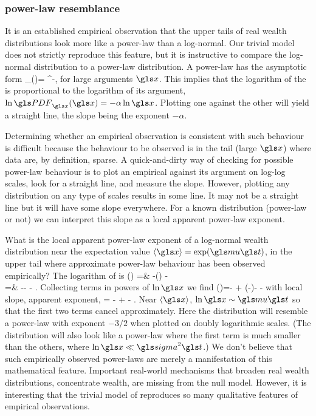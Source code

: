 \subsubsection{power-law resemblance}
It is an established empirical observation \cite{Newman2005} that the upper tails of 
real wealth distributions look more like a power-law than a log-normal. Our trivial model does not
strictly reproduce this feature, but it is instructive to compare the log-normal distribution
to a power-law distribution. A power-law \PDFa has the asymptotic form 
\be
\PDF_\x(\x)= \x^{-\alpha},
\ee
for large arguments $\x$. This implies that the logarithm of the \PDFa is proportional 
to the logarithm of its argument, $\ln \PDF_\x(\x) = -\alpha \ln \x$. Plotting
one against the other will yield a straight line, the slope being the exponent $-\alpha$. 

Determining whether an empirical observation is consistent with such behaviour 
is difficult because the behaviour to be observed is in the tail (large $\x$) where data are,
by definition, sparse. A quick-and-dirty way of checking for possible power-law 
behaviour is to plot an empirical \PDFa against its argument on log-log scales, 
look for a straight line, and measure the slope. However, plotting any distribution on any 
type of scales results in some line. It may not be a straight line but it will have some slope 
everywhere. For a known distribution (power-law or not) we can interpret this slope 
as a local apparent power-law exponent. 

What is the local apparent power-law exponent of a log-normal wealth distribution near the 
expectation value $\ave{\x}=\exp(\gmu \t)$, \ie in the upper tail where approximate power-law behaviour
has been observed empirically? The logarithm of  is
\bea
\ln \PDF(\x) =& -\ln\left(\x{}\right) -\\
=& -\ln \x - - .
\eea
Collecting terms in powers of $\ln \x$ we find
\be
\ln \PDF(\x)=-  + \left(-\right)\ln \x - -
\ee
with local slope, \ie apparent exponent,
\be
\frac{\gd\ln \PDF(\x)}{\gd \ln \x} = - \frac{\ln \x}{\gsigma^2 \t}  +  - .
\ee
Near $\ave{\x}$, $\ln \x \sim \gmu \t$ so that the first two terms cancel approximately. Here the distribution will resemble a power-law with exponent $-3/2$ when plotted on doubly logarithmic scales. (The distribution will also look like a power-law where the first term is much smaller than the others, \eg where $\ln \x \ll \gsigma^2 \t$.) We don't believe that such empirically observed power-laws are merely a manifestation of this mathematical feature. Important real-world  mechanisms that broaden real wealth distributions, \ie concentrate wealth, are missing from the null model. However, it is interesting that the trivial model of \GBM reproduces so many qualitative features of empirical observations. 

